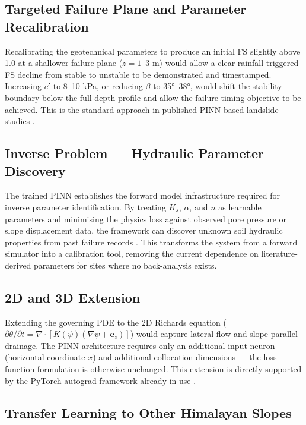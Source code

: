 \documentclass[12pt]{report}
\begin{document}
\subsection{Targeted Failure Plane and Parameter Recalibration}

Recalibrating the geotechnical parameters to produce an initial
FS slightly above 1.0 at a shallower failure plane ($z = 1$--$3$ m)
would allow a clear rainfall-triggered FS decline from stable to
unstable to be demonstrated and timestamped. Increasing $c'$ to
8--10 kPa, or reducing $\beta$ to 35°--38°, would shift the
stability boundary below the full depth profile and allow the
failure timing objective to be achieved. This is the standard
approach in published PINN-based landslide studies
\cite{depina2022pinn, krkac2023pinn}.

\subsection{Inverse Problem — Hydraulic Parameter Discovery}

The trained PINN establishes the forward model infrastructure
required for inverse parameter identification. By treating $K_s$,
$\alpha$, and $n$ as learnable parameters and minimising the
physics loss against observed pore pressure or slope displacement
data, the framework can discover unknown soil hydraulic properties
from past failure records \cite{wang2025pinns, niu2025inverse}.
This transforms the system from a forward simulator into a
calibration tool, removing the current dependence on literature-
derived parameters for sites where no back-analysis exists.

\subsection{2D and 3D Extension}

Extending the governing PDE to the 2D Richards equation
($\partial\theta/\partial t = \nabla \cdot [K(\psi)(\nabla\psi +
\mathbf{e}_z)]$) would capture lateral flow and slope-parallel
drainage. The PINN architecture requires only an additional input
neuron (horizontal coordinate $x$) and additional collocation
dimensions — the loss function formulation is otherwise unchanged.
This extension is directly supported by the PyTorch autograd
framework already in use \cite{karniadakis2021pinns}.

\subsection{Transfer Learning to Other Himalayan Slopes}
\end{document}
